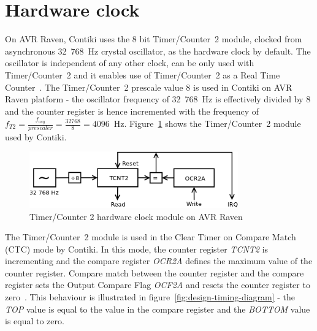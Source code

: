 
\section{Hardware clock}\label{sec:analysis-hwclock}
On AVR Raven, Contiki uses the 8 bit Timer/Counter~2 module,
clocked from asynchronous 32~768~Hz crystal oscillator, as the hardware clock by default.
The oscillator is independent of any other clock,
can be only used with Timer/Counter~2 and it
enables use of Timer/Counter~2 as a Real Time Counter~\cite{avr-datasheet}.
The Timer/Counter~2 prescale value 8 is used in Contiki on AVR Raven platform -
the oscillator frequency of 32~768~Hz is effectively divided by 8 and
the counter register is hence incremented with the frequency of
$f_{T2} = {\frac{f_{asy}}{prescaler}} = {\frac{32768}{8}} = 4096$~Hz.
Figure~\ref{fig:avr-clock} shows the Timer/Counter~2 module used by Contiki.
\begin{figure}
  \centering
  \includegraphics[width=9cm,keepaspectratio]{fig/avr-clock.png}
  \caption{Timer/Counter 2 hardware clock module on AVR Raven}
  \label{fig:avr-clock}
\end{figure}


The Timer/Counter~2 module is used in the Clear Timer on Compare Match (CTC) mode by Contiki.
In this mode, the counter register {\it{TCNT2}} is incrementing
and the compare register {\it{OCR2A}} defines the maximum value of the counter register.
Compare match between the counter register and the compare register
sets the Output Compare Flag {\it{OCF2A}} and resets the counter register to zero~\cite{avr-datasheet}.
This behaviour is illustrated in figure~\ref{fig:design-timing-diagram}
- the {\it{TOP}} value is equal to the value in the compare register and the {\it{BOTTOM}} value is equal to zero.

